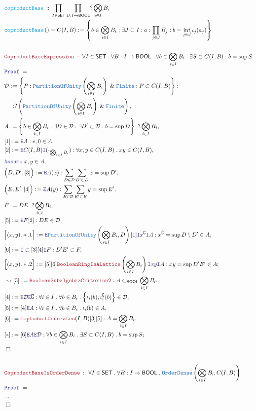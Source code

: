\documentclass[12pt]{scrartcl}
\newcommand{\TYPE}[1]{\textcolor{NavyBlue}{\mathtt{#1}}}
\newcommand{\FUNC}[1]{\textcolor{Cerulean}{\mathtt{#1}}}
\newcommand{\LOGIC}[1]{\textcolor{Blue}{\mathtt{#1}}}
\newcommand{\THM}[1]{\textcolor{Maroon}{\mathtt{#1}}}
\renewcommand{\.}{\; . \;}
\newcommand{\de}{: \kern 0.1pc =}
\newcommand{\Act}[1]{\left( #1 \right)}
\newcommand{\Theorem}[2]{& \THM{#1} \, :: \, #2 \\ & \Proof = \\ }
\newcommand{\DeclareFunc}[2]{& \FUNC{#1} \, :: \, #2 \\}
\newcommand{\DefineNamedFunc}[4]{&  \FUNC{#1}\Act{#2} = #3 \de #4 \\}
\newcommand{\NewLine}{\\ & \kern 1pc}
\newcommand{\Page}[1]{ \begin{align*} #1 \end{align*}   }
\newcommand{\NoProof}{ & \ldots \\ \EndProof}
\renewcommand{\And}{\; \& \;}
\newcommand{\Intro}{\LOGIC{I}}
\newcommand{\Elim}{\LOGIC{E}}
\renewcommand{\c}{\complement}
\newcommand{\Say}[3]{& #1 \de #2 : #3, \\}
\newcommand{\Conclude}[3]{& #1 \de #2 : #3; \\}
\newcommand{\Derive}[3]{& \leadsto #1 \de #2 : #3, \\}
\newcommand{\AssumeIn}[2]{& \LOGIC{Assume} \; #1 \in #2, \\}
\newcommand{\QED}{\; \square}
\newcommand{\EndProof}{& \QED \\}
\newcommand{\Proof}{\LOGIC{Proof} \; }
\newcommand{\D}{\mathcal{D}}
\newcommand{\SET}{\mathsf{SET}}
\newcommand{\PoU}{\TYPE{PartitionOfUnity}}
\newcommand{\OD}{\TYPE{OrderDense}}
\newcommand{\BOOL}{\mathsf{BOOL}}
\begin{document}
\Page{
		\DeclareFunc{coproductBase}
		{
			\prod_{I \in \SET}
			\prod_{B : I \to \BOOL}
			?\bigotimes_{i \in I} B_i
		}
		\DefineNamedFunc{coproductBase}{}{C(I,B)}
		{
			\left\{ 
				b \in  \bigotimes_{i \in I} B_i : 
				\exists J \subset I :
				a : \prod_{j \in J} B_j : 
				b = \inf_{j \in J} \iota_j(a_j)   
			\right\}
		}
		\\
	\Theorem{CoproductBaseExpression}
		{
			\forall I \in \SET \.
			\forall B : I \to \BOOL \.
			\forall b \in \bigotimes_{i \in I} B_i \.
			\exists  S \subset  C(I,B) : 
			b = \sup S
		}
		\Say{\D}{
			\left\{
				P : \PoU\left(\bigotimes_{i \in I} B_i\right) \And
					\TYPE{Finite} :
					P \subset C(I,B)
			\right\}}
		{
			\NewLine :			
			?\left(
				\PoU\left(\bigotimes_{i \in I} B_i\right) \And
				\TYPE{Finite}
			\right)
		}
		\Say{A}{
			\left\{
				b \in  \bigotimes_{i \in I} B_i :
				\exists D \in \D : \exists D' \subset \D  : b = \sup D
			\right\}		
		  }
		  {
		  	?\bigotimes_{i \in I} B_i
		  }
		\Say{[1]}{\Elim A}{e,0 \in A}
		\Say{[2]}{\Elim C(I,B)\Intro (\cdot_{\bigotimes_{i \in I} B_i})}
		{
			\forall x,y \in C(I,B) \. xy \in C(I,B)
		}
		\AssumeIn{x,y}{A}
		\Say{\Big(D,D',[3]\Big)}{\Elim A (x)}
		{
			\sum_{D \in \D} 
			\sum_{D' \subset D}
			x = \sup D'
		}
		\Say{\Big(E,E',[4]\Big)}{\Elim A (y)}
		{
			\sum_{E \in \D} 
			\sum_{E' \subset E}
			y = \sup E'
		}
		\Say{F}{DE}{?\bigotimes_{i \in i} B_i}
		\Say{[5]}{\Elim F[2]}{DE \in \D}
		\Say{\Big[(x,y).*.1\Big]}
		{
			\Elim \PoU\left(\bigotimes_{i \in I} B_i,D\right)[1]
			\Intro x^\c
			\Intro A
		}	
		{x^\c = \sup D \setminus D' \in A}
		\Say{[6]}{\Intro \subset [3][4]\Intro F}{D'E' \subset F}		
		\Conclude{\Big[(x,y).*.2\Big]}
		{
			[5][6] 
			\THM{BooleanRingIsALattice}
			\left( \bigotimes_{i \in I} B_i \right) \Intro xy \Intro A
		}
		{
			xy = \sup D'E' \in A
		}
		\Derive{[3]}{\THM{BooleanSubalgebraCriterion2}}
		{
		 	A \subset_\BOOL \bigotimes_{i \in I} B_i
		}
		\Say{[4]}{\Elim \D \Elim \c}
		{
				\forall i \in I \. \forall b \in B_i \.
				\Big\{ \iota_i(b),\iota_i^\c(b) \Big\} \in \D	
		}
		\Say{[5]}{[4]\Elim A}{
			\forall i \in I \.
			\forall b \in B_i \.
			\iota_i(b) \in A
		}
		\Say{[6]}{\THM{CoptoductGenerates}(I,B)[3][5]}
		{
			A = \bigotimes_{i \in I} B_i
		}
		\Conclude{[*]}{[6]\Elim A \Elim \D}
		{
			\forall b \in \bigotimes_{i \in I} B_i \.
			\exists S \subset C(I,B) \.
			b = \sup S
		}
		\EndProof
		\\
		\Theorem{CoproductBaseIsOrderDense}
		{
			\forall I \in \SET \.
			\forall B : I \to \BOOL \.
			\OD\left(\bigotimes_{i \in I} B_i, C(I,B)  \right)
		}
		\NoProof				
}
\end{document}
